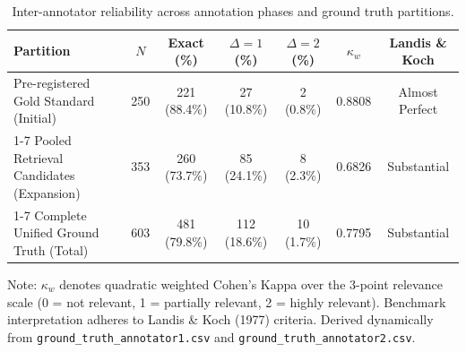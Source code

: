 \begin{table}[t]
\caption{Inter-annotator reliability across annotation phases and ground truth partitions.}
\label{tab:inter_annotator_agreement}
\centering\footnotesize
\setlength{\tabcolsep}{8pt}
\begin{threeparttable}
\begin{tabular}{@{}lcccccc@{}}
\toprule
Partition & $N$ & Exact (\%) & $\Delta = 1$ (\%) & $\Delta = 2$ (\%) & $\kappa_w$ & Landis \& Koch \\
\midrule
Pre-registered Gold Standard (Initial) & 250 & 221 (88.4\%) & 27 (10.8\%) & 2 (0.8\%) & 0.8808 & Almost Perfect \\
\cmidrule(lr){1-7}
Pooled Retrieval Candidates (Expansion) & 353 & 260 (73.7\%) & 85 (24.1\%) & 8 (2.3\%) & 0.6826 & Substantial \\
\cmidrule(lr){1-7}
Complete Unified Ground Truth (Total) & 603 & 481 (79.8\%) & 112 (18.6\%) & 10 (1.7\%) & 0.7795 & Substantial \\
\bottomrule
\end{tabular}
\begin{tablenotes}\footnotesize
\item[] Note: $\kappa_w$ denotes quadratic weighted Cohen's Kappa over the 3-point relevance scale (0 = not relevant, 1 = partially relevant, 2 = highly relevant). Benchmark interpretation adheres to Landis \& Koch (1977) criteria. Derived dynamically from \texttt{ground\_truth\_annotator1.csv} and \texttt{ground\_truth\_annotator2.csv}.
\end{tablenotes}
\end{threeparttable}
\end{table}